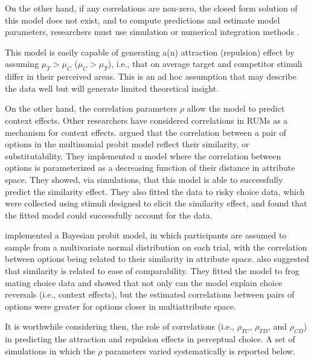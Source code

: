 On the other hand, if any correlations are non-zero, the closed form solution of this model does not exist, and to compute predictions and estimate model parameters, researchers must use simulation or numerical integration methods \parencite{train2009discrete}. 

This model is easily capable of generating a(n) attraction (repulsion) effect by assuming $\mu_{T}>\mu_{C}$ ($\mu_{C}>\mu_{T}$), i.e., that on average target and competitor stimuli differ in their perceived areas. This is an ad hoc assumption that may describe the data well but will generate limited theoretical insight. 

On the other hand, the correlation parameters $\rho$ allow the model to predict context effects. Other researchers have considered correlations in RUMs as a mechanism for context effects. \textcite{kamakura1984predicting} argued that the correlation between a pair of options in the multinomial probit model reflect their similarity, or substitutability. They implemented a model where the correlation between options is parameterized as a decreasing function of their distance in attribute space. They showed, via simulations, that this model is able to successfully predict the similarity effect. They also fitted the data to risky choice data, which were collected using stimuli designed to elicit the similarity effect, and found that the fitted model could successfully account for the data. 

\textcite{natenzon2019random} implemented a Bayesian probit model, in which participants are assumed to sample from a multivariate normal distribution on each trial, with the correlation between options being related to their similarity in attribute space. \textcite{natenzon2019random} also suggested that similarity is related to ease of comparability. They fitted the model to frog mating choice data and showed that not only can the model explain choice reversals (i.e., context effects), but the estimated correlations between pairs of options were greater for options closer in multiattribute space. 

It is worthwhile considering then, the role of correlations (i.e., $\rho_{TC}$, $\rho_{TD}$, and $\rho_{CD}$) in predicting the attraction and repulsion effects in perceptual choice. A set of simulations in which the $\rho$ parameters varied systematically is reported below. 

